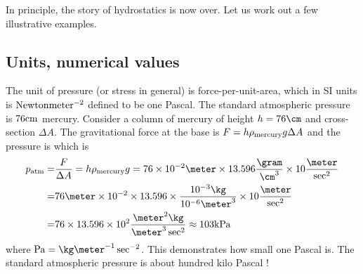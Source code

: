 In principle, the story of hydrostatics is now over.  Let us work out
a few illustrative examples.
\subsection{Units, numerical values}
The unit of pressure (or stress in general) is force-per-unit-area,
which in SI units is ${\rm Newton}{\rm meter}^{-2}$ defined to be one
Pascal. The standard atmospheric pressure is $76 {\rm cm}$ mercury.
Consider a column of mercury of height $h = 76 \cm$ and cross-section
$\Delta A$. The gravitational force at the base is $F= h \rho_{\rm
  mercury} g \Delta A$ and the pressure is 
which is 
\begin{eqnarray}
p_{\rm atm} =&\frac{F}{\Delta A} = h\rho_{\rm mercury} g =
76 \times 10^{-2} \meter \times 13.596 \frac{\gram}{\cm^3} \times 10 \frac{\meter}{\sec^2} \nonumber
\nonumber   \\
=&76 \meter\times 10^{-2} \times 13.596 \times \frac{10^{-3}\kg}{10^{-6}
  \meter^3} \times 10 \frac{\meter}{\sec^2} \nonumber \\
=&76\times 13.596\times 10^{2} \frac{\meter^2\kg  }{\meter^3\sec^2}
    \approx 103 {\rm kPa}  \nonumber
\end{eqnarray}
where ${\rm Pa} =  \kg\meter^{-1}\sec^{-2}$. This demonstrates how
small one Pascal is.  The standard atmospheric pressure is about
hundred kilo Pascal ! 

